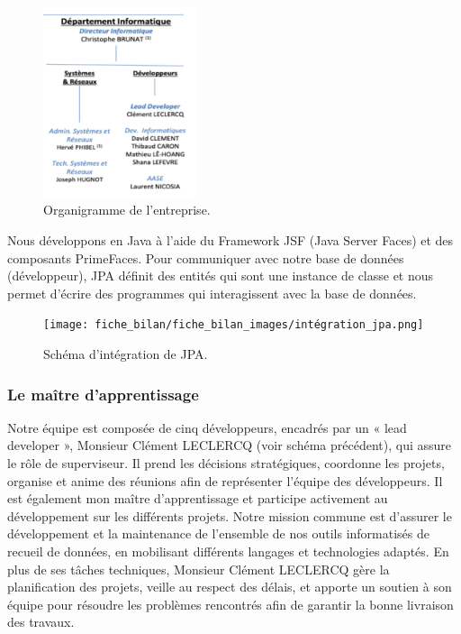 \begin{figure}[H]
    \centering
    \includegraphics[width=0.4\textwidth]{fiche_bilan/fiche_bilan_images/organigramme_info.png} 
    \caption{Organigramme de l'entreprise.}
\end{figure}
Nous développons en Java à l’aide du Framework JSF (Java Server Faces) et
des composants PrimeFaces.
Pour communiquer avec notre base de données (développeur), JPA définit des
entités qui sont une instance de classe et nous permet d’écrire des
programmes qui interagissent avec la base de données.
\begin{figure}[H]
    \centering
    \texttt{[image: fiche\_bilan/fiche\_bilan\_images/intégration\_jpa.png]} 
    \caption{Schéma d'intégration de JPA.}
\end{figure}

\subsubsection{Le maître d'apprentissage}
Notre équipe est composée de cinq développeurs, encadrés par un « lead developer », Monsieur Clément LECLERCQ (voir schéma précédent), qui assure le rôle de superviseur. Il prend les décisions stratégiques, coordonne les projets, organise et anime des réunions afin de représenter l’équipe des développeurs. Il est également mon maître d’apprentissage et participe activement au développement sur les différents projets.
Notre mission commune est d’assurer le développement et la maintenance de l’ensemble de nos outils informatisés de recueil de données, en mobilisant différents langages et technologies adaptés. En plus de ses tâches techniques, Monsieur Clément LECLERCQ gère la planification des projets, veille au respect des délais, et apporte un soutien à son équipe pour résoudre les problèmes rencontrés afin de garantir la bonne livraison des travaux.

